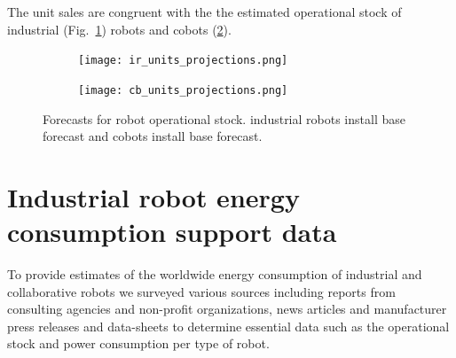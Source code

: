 The unit sales are congruent with the the estimated operational stock of industrial (Fig.~\ref{fig:ir_stock}) robots and cobots (\ref{fig:cobot_stock}).
\begin{figure}[!h]
	\centering
	\hspace*{\fill}
	\begin{subfigure}[t]{0.45\textwidth}
		\subcaption{}
		\texttt{[image: ir\_units\_projections.png]}
		\label{fig:ir_stock}
	\end{subfigure}
	\hfill
	\begin{subfigure}[t]{0.45\textwidth}
		\subcaption{}
		\texttt{[image: cb\_units\_projections.png]}
		\label{fig:cobot_stock}
	\end{subfigure}
	\hspace*{\fill}	
	\caption[] {\label{fig:robot_forecasts} Forecasts for robot operational stock.  industrial robots install base forecast and  cobots install base forecast.}	
\end{figure}
\newpage
\section{Industrial robot energy consumption support data}\label{sec:app_robot_ener_consumption}
To provide estimates of the worldwide energy consumption of industrial and collaborative robots we surveyed various sources including reports from consulting agencies and non-profit organizations, news articles and manufacturer press releases and data-sheets to determine essential data such as the operational stock and power consumption per type of robot.

